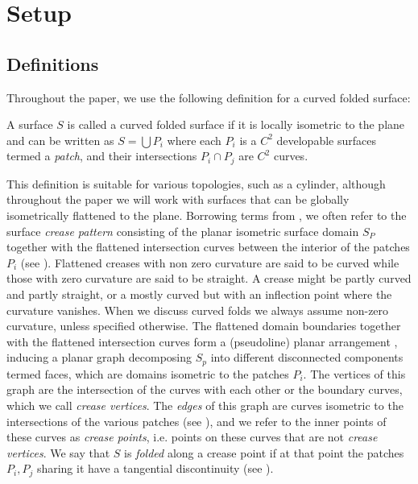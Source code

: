 \section{Setup} \label{sec:setup}
\subsection{Definitions}
Throughout the paper, we use the following definition for a curved folded surface:
\begin{definition} \label{def:curved_folded_surface}
A surface $S$ is called a curved folded surface if it is locally isometric to the plane and can be written as $S = \bigcup P_i $ where each $P_i$ is a $C^2$ developable surfaces termed a \textit{patch}, and their intersections $P_i \cap P_j$ are $C^2$ curves.
\end{definition}
This definition is suitable for various topologies, such as a cylinder, although throughout the paper we will work with surfaces that can be globally isometrically flattened to the plane. Borrowing terms from \cite{origami_book,non_pleated}, we often refer to the surface \textit{crease pattern} consisting of the planar isometric surface domain $S_P$ together with the flattened intersection curves between the interior of the patches $P_i$ (see ). Flattened creases with non zero curvature are said to be curved while those with zero curvature are said to be straight. A crease might be partly curved and partly straight, or a mostly curved but with an inflection point where the curvature vanishes. When we discuss curved folds we always assume non-zero curvature, unless specified otherwise. The flattened domain boundaries together with the flattened intersection curves form a (pseudoline) planar arrangement \cite{arrangements}, inducing a planar graph decomposing $S_p$ into different disconnected components termed faces, which are domains isometric to the patches $P_i$. The vertices of this graph are the intersection of the curves with each other or the boundary curves, which we call \textit{crease vertices}. The \textit{edges} of this graph are curves isometric to the intersections of the various patches (see ), and we refer to the inner points of these curves as \textit{crease points}, i.e. points on these curves that are not \textit{crease vertices}. We say that $S$ is \emph{folded} along a crease point if at that point the patches $P_i,P_j$ sharing it have a tangential discontinuity (see ).

